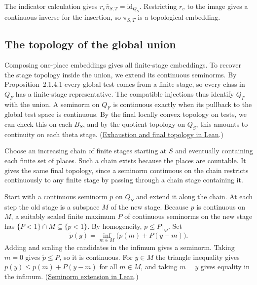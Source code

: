 The indicator calculation gives \(r_v\bar\pi_{S,T}=\mathrm{id}_{Q_S}\).
Restricting \(r_v\) to the image gives a continuous inverse for the
insertion, so \(\bar\pi_{S,T}\) is a topological embedding.

\subsection{The topology of the global union}

Composing one-place embeddings gives all finite-stage embeddings. To recover
the stage topology inside the union, we extend its continuous seminorms.
By Proposition~2.1.4.1 every global test comes from a finite stage, so every
class in \(Q_F\) has a finite-stage representative. The compatible injections
thus identify \(Q_F\) with the union. A seminorm on \(Q_F\) is continuous
exactly when its pullback to the global test space is continuous. By the
final locally convex topology on tests, we can check this on each \(B_S\),
and by the quotient topology on \(Q_S\), this amounts to continuity on each
theta stage.
(\href{https://github.com/mccorvie/riemann-masullo/blob/ac7e1cde68ff1fac01ecbef3c0e9f48e46bc1f06/RiemannMasullo/Ch05_ThetaZSpaces/Sec2.lean#L2458-L2499}{Exhaustion and final topology in Lean}.)

Choose an increasing chain of finite stages starting at \(S\) and eventually
containing each finite set of places. Such a chain exists because the places
are countable. It gives the same final topology, since a seminorm continuous
on the chain restricts continuously to any finite stage by passing through a
chain stage containing it.

Start with a continuous seminorm \(p\) on \(Q_S\) and extend it along the
chain. At each step the old stage is a subspace \(M\) of the new stage.
Because \(p\) is continuous on \(M\), a suitably scaled finite maximum
\(P\) of continuous seminorms on the new stage has
\(\{P<1\}\cap M\subseteq\{p<1\}\). By homogeneity, \(p\leq P|_M\). Set
\[
  \widetilde p(y)=\inf_{m\in M}\bigl(p(m)+P(y-m)\bigr).
\]
Adding and scaling the candidates in the infimum gives a seminorm. Taking
\(m=0\) gives \(\widetilde p\leq P\), so it is continuous. For \(y\in M\) the triangle
inequality gives \(p(y)\leq p(m)+P(y-m)\) for all \(m\in M\), and taking
\(m=y\) gives equality in the infimum.
(\href{https://github.com/mccorvie/riemann-masullo/blob/ac7e1cde68ff1fac01ecbef3c0e9f48e46bc1f06/RiemannMasullo/ForMathlib/Analysis/LocallyConvex/WithSeminorms.lean#L19-L46}{Seminorm extension in Lean}.)

